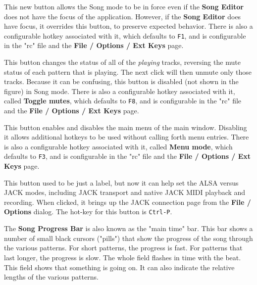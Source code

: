    \setcounter{ItemCounter}{0}      %

   This new button allows the Song mode to be in force even if
   the \textbf{Song Editor} does not have the focus of the application.
   However, if the \textbf{Song Editor} does have focus, it overrides this
   button, to preserve expected behavior.
   There is also a configurable hotkey associated with it,
   which defaults to \texttt{F1}, and is configurable in the "rc" file and
   the \textbf{File / Options / Ext Keys} page.

   This button changes the status of all of the
   \textsl{playing} tracks, reversing the
   mute status of each pattern that is playing.
   The next click will then unmute only those tracks.
   Because it can be confusing, this button is disabled (not shown
   in the figure) in Song mode.
   There is also a configurable hotkey associated with it, called
   \textbf{Toggle mutes},
   which defaults to \texttt{F8}, and is configurable in the "rc" file and
   the \textbf{File / Options / Ext Keys} page.

   This button enables and disables the main menu of the main window.
   Disabling it allows additional hotkeys to be used without calling forth menu
   entries.
   There is also a configurable hotkey associated with it, called
   \textbf{Menu mode},
   which defaults to \texttt{F3}, and is configurable in the "rc" file and
   the \textbf{File / Options / Ext Keys} page.

   This button used to be just a label, but now it can help set the ALSA versus
   JACK modes, including JACK transport and native JACK MIDI playback and
   recording.
   When clicked, it brings up the JACK connection page from the
   \textbf{File / Options} dialog.  The hot-key for this button
   is \texttt{Ctrl-P}.

   The \textbf{Song Progress Bar} is also known as the "main time" bar.
   This bar shows a number of small black cursors ("pills") that show the
   progress of the song through the various patterns.  For short patterns,
   the progress is fast.  For patterns that last longer, the progress is
   slow.  The whole field flashes in time with the beat.
   This field shows that something is going on.  It can also indicate
   the relative lengths of the various patterns.

